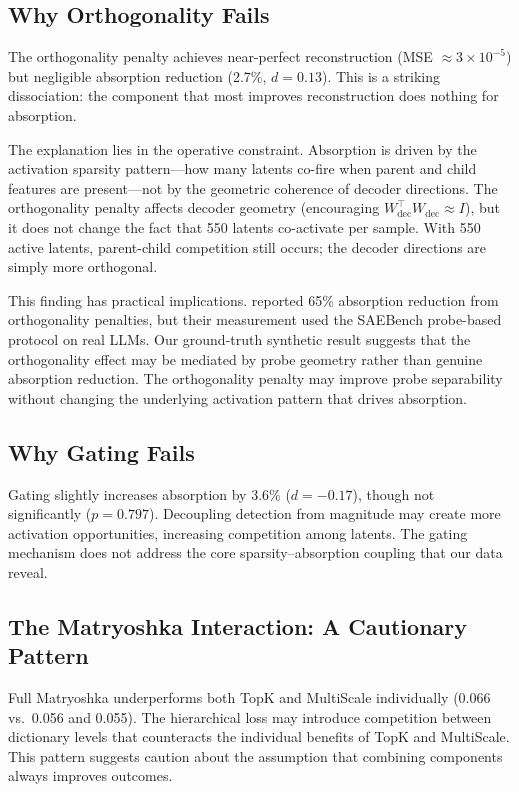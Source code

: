 \documentclass{article}
\begin{document}
\subsection{Why Orthogonality Fails}

The orthogonality penalty achieves near-perfect reconstruction (MSE $\approx 3 \times 10^{-5}$) but negligible absorption reduction (2.7\%, $d = 0.13$). This is a striking dissociation: the component that most improves reconstruction does nothing for absorption.

The explanation lies in the operative constraint. Absorption is driven by the activation sparsity pattern---how many latents co-fire when parent and child features are present---not by the geometric coherence of decoder directions. The orthogonality penalty affects decoder geometry (encouraging $W_{\text{dec}}^\top W_{\text{dec}} \approx I$), but it does not change the fact that 550 latents co-activate per sample. With 550 active latents, parent-child competition still occurs; the decoder directions are simply more orthogonal.

This finding has practical implications. \citet{korznikov2025ortsae} reported 65\% absorption reduction from orthogonality penalties, but their measurement used the SAEBench probe-based protocol on real LLMs. Our ground-truth synthetic result suggests that the orthogonality effect may be mediated by probe geometry rather than genuine absorption reduction. The orthogonality penalty may improve probe separability without changing the underlying activation pattern that drives absorption.

\subsection{Why Gating Fails}

Gating slightly increases absorption by 3.6\% ($d = -0.17$), though not significantly ($p = 0.797$). Decoupling detection from magnitude may create more activation opportunities, increasing competition among latents. The gating mechanism does not address the core sparsity--absorption coupling that our data reveal.

\subsection{The Matryoshka Interaction: A Cautionary Pattern}

Full Matryoshka underperforms both TopK and MultiScale individually (0.066 vs.~0.056 and 0.055). The hierarchical loss may introduce competition between dictionary levels that counteracts the individual benefits of TopK and MultiScale. This pattern suggests caution about the assumption that combining components always improves outcomes.
\end{document}
